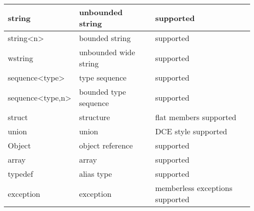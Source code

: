 \begin{center}\begin{tabular}{|l|l|l|}
\hline
string		& unbounded string		& supported\\\hline
string<n>	& bounded string		& supported\\\hline
wstring		& unbounded wide string		& supported\\\hline
sequence<type>	& type sequence			& supported\\\hline
sequence<type,n>& bounded type sequence		& supported\\\hline
struct		& structure			& flat members supported\\\hline
union		& union				& DCE style supported\\\hline
Object		& object reference		& supported\\\hline
array		& array				& supported\\\hline
typedef		& alias type			& supported\\\hline
exception	& exception			& memberless exceptions supported\\
\hline
\end{tabular}\end{center}
